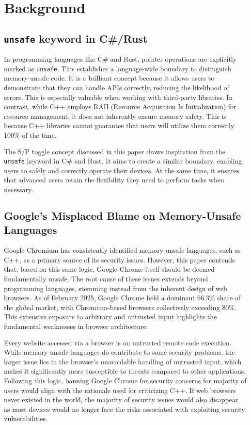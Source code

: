 \section{Background}

\subsection{\texttt{unsafe} keyword in C\#/Rust}
In programming languages like C\# and Rust, pointer operations are explicitly marked as \texttt{unsafe}. This establishes a language-wide boundary to distinguish memory-unsafe code. It is a brilliant concept because it allows users to demonstrate that they can handle APIs correctly, reducing the likelihood of errors. This is especially valuable when working with third-party libraries. In contrast, while C++ employs RAII (Resource Acquisition Is Initialization) for resource management, it does not inherently ensure memory safety. This is because C++ libraries cannot guarantee that users will utilize them correctly 100\% of the time.

The S/P toggle concept discussed in this paper draws inspiration from the \texttt{unsafe} keyword in C\# and Rust. It aims to create a similar boundary, enabling users to safely and correctly operate their devices. At the same time, it ensures that advanced users retain the flexibility they need to perform tasks when necessary.

\subsection{Google's Misplaced Blame on Memory-Unsafe Languages}

Google Chromium has consistently identified memory-unsafe languages, such as C++, as a primary source of its security issues\cite{ruleOf2}. However, this paper contends that, based on this same logic, Google Chrome itself should be deemed fundamentally unsafe. The root cause of these issues extends beyond programming languages, stemming instead from the inherent design of web browsers. As of February 2025, Google Chrome held a dominant 66.3\% share of the global market\cite{statcounter}, with Chromium-based browsers collectively exceeding 80\%. This extensive exposure to arbitrary and untrusted input highlights the fundamental weaknesses in browser architecture.

Every website accessed via a browser is an untrusted remote code execution. While memory-unsafe languages do contribute to some security problems, the larger issue lies in the browser's unavoidable handling of untrusted input, which makes it significantly more susceptible to threats compared to other applications. Following this logic, banning Google Chrome for security concerns for majority of users would align with the rationale used for criticizing C++. If web browsers never existed in the world, the majority of security issues would also disappear, as most devices would no longer face the risks associated with exploiting security vulnerabilities.

